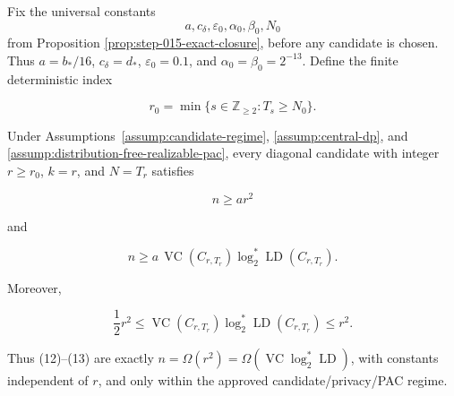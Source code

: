 \begin{proposition}\label{prop:step-016-rate-bridge}
Fix the universal constants
\[
a,c_\delta,\varepsilon_0,\alpha_0,\beta_0,N_0
\]
from Proposition \ref{prop:step-015-exact-closure}, before any candidate is
chosen. Thus \(a=b_*/16\), \(c_\delta=d_*\), \(\varepsilon_0=0.1\), and
\(\alpha_0=\beta_0=2^{-13}\). Define
the finite deterministic index

\[
r_0=\min\{s\in\mathbb Z_{\ge2}:T_s\ge N_0\}.
\tag{11}
\]

Under Assumptions~\ref{assump:candidate-regime},
\ref{assump:central-dp}, and
\ref{assump:distribution-free-realizable-pac}, every diagonal candidate
with integer \(r\ge r_0\), \(k=r\), and \(N=T_r\) satisfies

\[
n\ge ar^2
\tag{12}
\]

and

\[
n\ge
a\,\operatorname{VC}(C_{r,T_r})
   \log_2^*\operatorname{LD}(C_{r,T_r}).
\tag{13}
\]

Moreover,

\[
\frac12r^2
\le
\operatorname{VC}(C_{r,T_r})
\log_2^*\operatorname{LD}(C_{r,T_r})
\le r^2.
\tag{14}
\]

Thus (12)--(13) are exactly
\(n=\Omega(r^2)=\Omega(\operatorname{VC}\log_2^*\operatorname{LD})\),
with constants independent of \(r\), and only within the approved
candidate/privacy/PAC regime.
\end{proposition}

